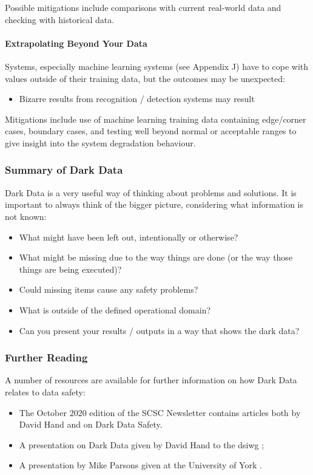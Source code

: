 Possible mitigations include comparisons with current real-world data and checking with historical data.

\paragraph{Extrapolating Beyond Your Data}\label{bkm:dark15}
Systems, especially machine learning systems (see Appendix J) have to cope with values outside of their training data, but the outcomes may be unexpected:
\begin{itemize}
\item Bizarre results from recognition / detection systems may result
\end{itemize}

Mitigations include use of machine learning training data containing edge/corner cases, boundary cases, and testing well beyond normal or acceptable ranges to give insight into the system degradation behaviour.
\subsubsection{Summary of Dark Data}
Dark Data is a very useful way of thinking about problems and solutions. It is important to always think of the bigger picture, considering what information is not known:

\begin{itemize}
  \item What might have been left out, intentionally or otherwise?
  \item What might be missing due to the way things are done (or the way those things are being executed)?
  \item Could missing items cause any safety problems?
  \item What is outside of the defined operational domain?
  \item Can you present your results / outputs in a way that shows the dark data?
\end{itemize}

\subsubsection{Further Reading}
A number of resources are available for further information on how Dark Data relates to data safety:
\begin{itemize}
\item The October 2020 edition of the SCSC Newsletter \cite{citation:SCSC160} contains articles both by David Hand and on Dark Data Safety.
  \item A presentation on Dark Data given by David Hand to the \gls{dsiwg} \cite{citation:darkdata:presentation1};
  \item A presentation by Mike Parsons given at the University of York \cite{citation:darkdata:presentation2}.
\end{itemize}
%
%
%
%
